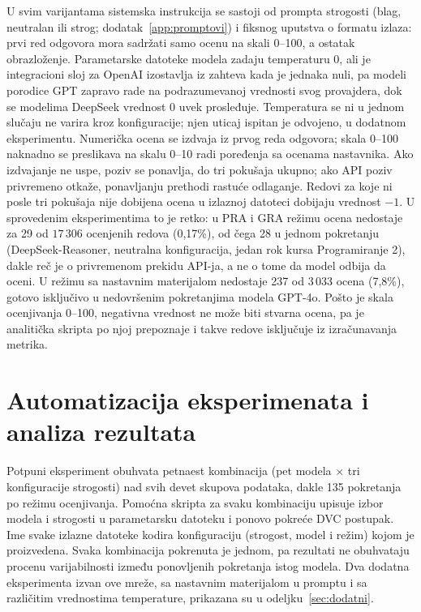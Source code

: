 U svim varijantama sistemska instrukcija se sastoji od prompta strogosti (blag,
neutralan ili strog; dodatak~\ref{app:promptovi}) i fiksnog uputstva o formatu izlaza:
prvi red odgovora mora sadržati samo ocenu na skali 0--100, a ostatak obrazloženje.
Parametarske datoteke modela zadaju temperaturu $0$,
ali je integracioni sloj za OpenAI izostavlja iz zahteva kada je jednaka nuli,
pa modeli porodice GPT zapravo rade na podrazumevanoj vrednosti svog provajdera,
dok se modelima DeepSeek vrednost $0$ uvek prosleđuje.
Temperatura se ni u jednom slučaju ne varira kroz konfiguracije;
njen uticaj ispitan je odvojeno, u dodatnom eksperimentu.
Numerička ocena se izdvaja iz prvog reda odgovora; skala 0--100 naknadno se preslikava na skalu 0--10 radi poređenja sa ocenama nastavnika.
Ako izdvajanje ne uspe, poziv se ponavlja, do tri pokušaja ukupno; ako API poziv privremeno otkaže, ponavljanju prethodi rastuće odlaganje.
Redovi za koje ni posle tri pokušaja nije dobijena ocena u izlaznoj datoteci dobijaju vrednost $-1$.
U sprovedenim eksperimentima to je retko:
u PRA i GRA režimu ocena nedostaje za 29 od $17\,306$ ocenjenih redova (0,17\%),
od čega 28 u jednom pokretanju (DeepSeek-Reasoner, neutralna konfiguracija, jedan rok kursa Programiranje 2),
dakle reč je o privremenom prekidu API-ja, a ne o tome da model odbija da oceni.
U režimu sa nastavnim materijalom nedostaje 237 od $3\,033$ ocena (7,8\%),
gotovo isključivo u nedovršenim pokretanjima modela GPT-4o.
Pošto je skala ocenjivanja 0--100, negativna vrednost ne može biti stvarna ocena,
pa je analitička skripta po njoj prepoznaje i takve redove isključuje iz izračunavanja metrika.

\section{Automatizacija eksperimenata i analiza rezultata}

Potpuni eksperiment obuhvata petnaest kombinacija (pet modela $\times$ tri konfiguracije strogosti) nad svih devet skupova podataka,
dakle 135 pokretanja po režimu ocenjivanja.
Pomoćna skripta za svaku kombinaciju upisuje izbor modela i strogosti u parametarsku datoteku i ponovo pokreće DVC postupak.
Ime svake izlazne datoteke kodira konfiguraciju (strogost, model i režim) kojom je proizvedena.
Svaka kombinacija pokrenuta je jednom, pa rezultati ne obuhvataju procenu varijabilnosti između ponovljenih pokretanja istog modela.
Dva dodatna eksperimenta izvan ove mreže, sa nastavnim materijalom u promptu
i sa različitim vrednostima temperature, prikazana su u odeljku~\ref{sec:dodatni}.

